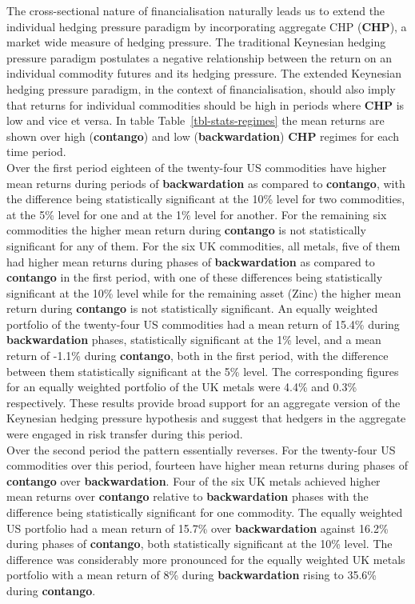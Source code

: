 \documentclass[
  authoryear,
  preprint,
  3p]{elsarticle}
\begin{document}
\medskip

The cross-sectional nature of financialisation naturally leads us to
extend the individual hedging pressure paradigm by incorporating
aggregate CHP (\textbf{CHP}), a market wide measure of hedging pressure.
The traditional Keynesian hedging pressure paradigm postulates a
negative relationship between the return on an individual commodity
futures and its hedging pressure. The extended Keynesian hedging
pressure paradigm, in the context of financialisation, should also imply
that returns for individual commodities should be high in periods where
\textbf{CHP} is low and vice et versa. In table
Table~\ref{tbl-stats-regimes} the mean returns are shown over high
(\textbf{contango}) and low (\textbf{backwardation}) \textbf{CHP}
regimes for each time period.\\
Over the first period eighteen of the twenty-four US commodities have
higher mean returns during periods of \textbf{backwardation} as compared
to \textbf{contango}, with the difference being statistically
significant at the 10\% level for two commodities, at the 5\% level for
one and at the 1\% level for another. For the remaining six commodities
the higher mean return during \textbf{contango} is not statistically
significant for any of them. For the six UK commodities, all metals,
five of them had higher mean returns during phases of
\textbf{backwardation} as compared to \textbf{contango} in the first
period, with one of these differences being statistically significant at
the 10\% level while for the remaining asset (Zinc) the higher mean
return during \textbf{contango} is not statistically significant. An
equally weighted portfolio of the twenty-four US commodities had a mean
return of 15.4\% during \textbf{backwardation} phases, statistically
significant at the 1\% level, and a mean return of -1.1\% during
\textbf{contango}, both in the first period, with the difference between
them statistically significant at the 5\% level. The corresponding
figures for an equally weighted portfolio of the UK metals were 4.4\%
and 0.3\% respectively. These results provide broad support for an
aggregate version of the Keynesian hedging pressure hypothesis and
suggest that hedgers in the aggregate were engaged in risk transfer
during this period.\\
Over the second period the pattern essentially reverses. For the
twenty-four US commodities over this period, fourteen have higher mean
returns during phases of \textbf{contango} over \textbf{backwardation}.
Four of the six UK metals achieved higher mean returns over
\textbf{contango} relative to \textbf{backwardation} phases with the
difference being statistically significant for one commodity. The
equally weighted US portfolio had a mean return of 15.7\% over
\textbf{backwardation} against 16.2\% during phases of
\textbf{contango}, both statistically significant at the 10\% level. The
difference was considerably more pronounced for the equally weighted UK
metals portfolio with a mean return of 8\% during \textbf{backwardation}
rising to 35.6\% during \textbf{contango}.
\end{document}

